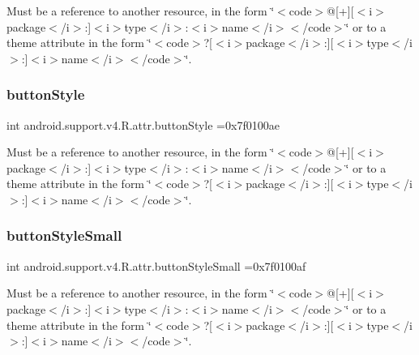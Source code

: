 Must be a reference to another resource, in the form \char`\"{}$<$code$>$@\mbox{[}+\mbox{]}\mbox{[}$<$i$>$package$<$/i$>$\+:\mbox{]}$<$i$>$type$<$/i$>$\+:$<$i$>$name$<$/i$>$$<$/code$>$\char`\"{} or to a theme attribute in the form \char`\"{}$<$code$>$?\mbox{[}$<$i$>$package$<$/i$>$\+:\mbox{]}\mbox{[}$<$i$>$type$<$/i$>$\+:\mbox{]}$<$i$>$name$<$/i$>$$<$/code$>$\char`\"{}. \mbox{\label{classandroid_1_1support_1_1v4_1_1R_1_1attr_aa24d1272610cc52a96b5b53bcd08e9a7}} 
\subsubsection{\texorpdfstring{button\+Style}{buttonStyle}}
{\footnotesize\ttfamily int android.\+support.\+v4.\+R.\+attr.\+button\+Style =0x7f0100ae\hspace{0.3cm}{\ttfamily [static]}}

Must be a reference to another resource, in the form \char`\"{}$<$code$>$@\mbox{[}+\mbox{]}\mbox{[}$<$i$>$package$<$/i$>$\+:\mbox{]}$<$i$>$type$<$/i$>$\+:$<$i$>$name$<$/i$>$$<$/code$>$\char`\"{} or to a theme attribute in the form \char`\"{}$<$code$>$?\mbox{[}$<$i$>$package$<$/i$>$\+:\mbox{]}\mbox{[}$<$i$>$type$<$/i$>$\+:\mbox{]}$<$i$>$name$<$/i$>$$<$/code$>$\char`\"{}. \mbox{\label{classandroid_1_1support_1_1v4_1_1R_1_1attr_a1d9fea4ceb03e8088fdb83e6d77cc643}} 
\subsubsection{\texorpdfstring{button\+Style\+Small}{buttonStyleSmall}}
{\footnotesize\ttfamily int android.\+support.\+v4.\+R.\+attr.\+button\+Style\+Small =0x7f0100af\hspace{0.3cm}{\ttfamily [static]}}

Must be a reference to another resource, in the form \char`\"{}$<$code$>$@\mbox{[}+\mbox{]}\mbox{[}$<$i$>$package$<$/i$>$\+:\mbox{]}$<$i$>$type$<$/i$>$\+:$<$i$>$name$<$/i$>$$<$/code$>$\char`\"{} or to a theme attribute in the form \char`\"{}$<$code$>$?\mbox{[}$<$i$>$package$<$/i$>$\+:\mbox{]}\mbox{[}$<$i$>$type$<$/i$>$\+:\mbox{]}$<$i$>$name$<$/i$>$$<$/code$>$\char`\"{}. \mbox{\label{classandroid_1_1support_1_1v4_1_1R_1_1attr_a68ad5bf40f3267e918dbf536fd164b52}} 
